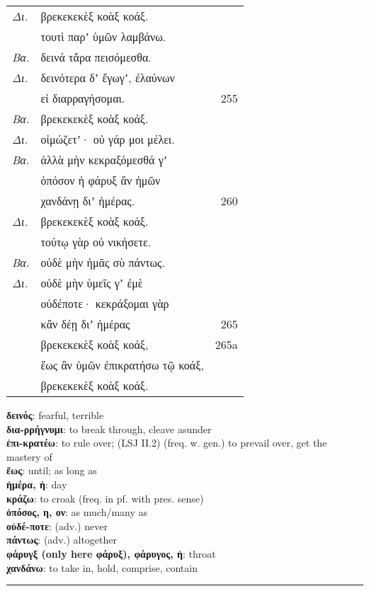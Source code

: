 \documentclass[13pt]{article}
\newcommand{\vocabentry}[2]{\textbf{#1}: #2\vspace{0.0em}\\}
\begin{document}
\begin{greek}
\newpage
\begin{spacing}{1.5}
\begin{tabularx}{\textwidth}{@{}lXr@{}}
\textit{Δι.} & βρεκεκεκὲξ κοὰξ κοάξ. &  \\
& τουτὶ παρʼ ὑμῶν λαμβάνω. &  \\
\textit{Βα.} & δεινά τἄρα πεισόμεσθα. &  \\
\textit{Δι.} & δεινότερα δʼ ἔγωγʼ, ἐλαύνων &  \\
& εἰ διαρραγήσομαι. & 255 \\
\textit{Βα.} & βρεκεκεκὲξ κοὰξ κοάξ. &  \\
\textit{Δι.} & οἰμώζετʼ· οὐ γάρ μοι μέλει. &  \\
\textit{Βα.} & ἀλλὰ μὴν κεκραξόμεσθά γʼ &  \\
& ὁπόσον ἡ φάρυξ ἂν ἡμῶν &  \\
& χανδάνῃ διʼ ἡμέρας. & 260 \\
\textit{Δι.} & βρεκεκεκὲξ κοὰξ κοάξ. &  \\
& τούτῳ γὰρ οὐ νικήσετε. &  \\
\textit{Βα.} & οὐδὲ μὴν ἡμᾶς σὺ πάντως. &  \\
\textit{Δι.} & οὐδὲ μὴν ὑμεῖς γʼ ἐμὲ &  \\
& οὐδέποτε· κεκράξομαι γὰρ &  \\
& κἂν δέῃ διʼ ἡμέρας & 265 \\
& βρεκεκεκὲξ κοὰξ κοάξ, & 265a \\
& ἕως ἂν ὑμῶν ἐπικρατήσω τῷ κοάξ, &  \\
& βρεκεκεκὲξ κοὰξ κοάξ. &  \\
\end{tabularx}
\end{spacing}

\newpage
\begin{multicols}{2}
\small %
\vocabentry{δεινός}{fearful, terrible}
\vocabentry{δια-ρρήγνυμι}{to break through, cleave asunder}
\vocabentry{ἐπι-κρατέω}{to rule over; (LSJ II.2) (freq. w. gen.) to prevail over, get the mastery of}
\vocabentry{ἕως}{until; as long as}
\vocabentry{ἡμέρα, ἡ}{day}
\vocabentry{κράζω}{to croak (freq. in pf. with pres. sense)}
\vocabentry{ὁπόσος, η, ον}{as much/many as}
\vocabentry{οὐδέ-ποτε}{(adv.) never}
\vocabentry{πάντως}{(adv.) altogether}
\vocabentry{φάρυγξ (only here φάρυξ), φάρυγος, ἡ}{throat}
\vocabentry{χανδάνω}{to take in, hold, comprise, contain}
\end{multicols}

\vspace{-1.5em}
\noindent\rule{\linewidth}{0.4pt}
\vspace{-2em}


\end{greek}
\end{document}
